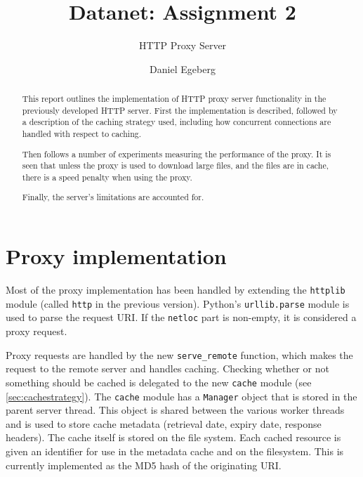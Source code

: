 \documentclass{sig-alternate}
\begin{document}
\title{Datanet: Assignment 2}
\subtitle{HTTP Proxy Server}


\author{
\alignauthor
    Daniel Egeberg\\
}

\maketitle

\begin{abstract}
    This report outlines the implementation of HTTP proxy server functionality
    in the previously developed HTTP server. First the implementation is
    described, followed by a description of the caching strategy used,
    including how concurrent connections are handled with respect to caching.

    Then follows a number of experiments measuring the performance of the
    proxy. It is seen that unless the proxy is used to download large files,
    and the files are in cache, there is a speed penalty when using the proxy.

    Finally, the server's limitations are accounted for.
\end{abstract}

\section{Proxy implementation}
\label{sec:implementation}

Most of the proxy implementation has been handled by extending the
\verb+httplib+ module (called \verb+http+ in the previous version). Python's
\verb+urllib.parse+ module is used to parse the request URI. If the
\verb+netloc+ part is non-empty, it is considered a proxy request.

Proxy requests are handled by the new \verb+serve_remote+ function, which
makes the request to the remote server and handles caching. Checking whether
or not something should be cached is delegated to the new \verb+cache+
module (see \autoref{sec:cachestrategy}). The \verb+cache+ module has a
\verb+Manager+ object that is stored in the parent server thread. This object
is shared between the various worker threads and is used to store cache
metadata (retrieval date, expiry date, response headers). The cache itself is
stored on the file system. Each cached resource is given an identifier for use
in the metadata cache and on the filesystem. This is currently implemented as
the MD5 hash of the originating URI.
\end{document}
